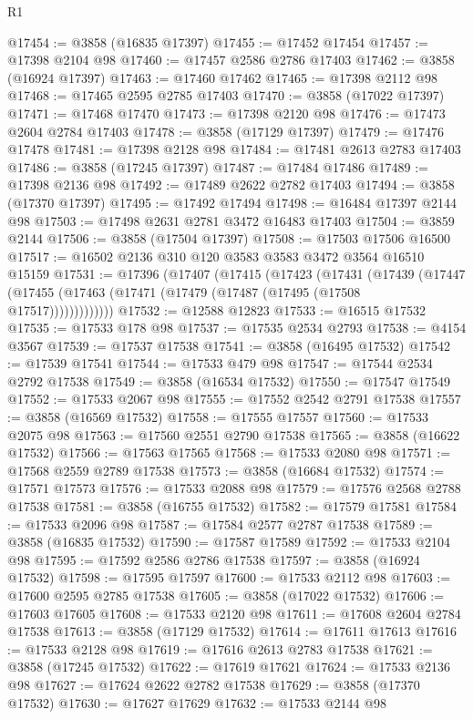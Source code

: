 \begin{lexlean}{R1}
\begin{coremodule}
@17454 := @3858 (@16835 @17397)
@17455 := @17452 @17454
@17457 := @17398 @2104 @98
@17460 := @17457 @2586 @2786 @17403
@17462 := @3858 (@16924 @17397)
@17463 := @17460 @17462
@17465 := @17398 @2112 @98
@17468 := @17465 @2595 @2785 @17403
@17470 := @3858 (@17022 @17397)
@17471 := @17468 @17470
@17473 := @17398 @2120 @98
@17476 := @17473 @2604 @2784 @17403
@17478 := @3858 (@17129 @17397)
@17479 := @17476 @17478
@17481 := @17398 @2128 @98
@17484 := @17481 @2613 @2783 @17403
@17486 := @3858 (@17245 @17397)
@17487 := @17484 @17486
@17489 := @17398 @2136 @98
@17492 := @17489 @2622 @2782 @17403
@17494 := @3858 (@17370 @17397)
@17495 := @17492 @17494
@17498 := @16484 @17397 @2144 @98
@17503 := @17498 @2631 @2781 @3472 @16483 @17403
@17504 := @3859 @2144
@17506 := @3858 (@17504 @17397)
@17508 := @17503 @17506 @16500
@17517 := @16502 @2136 @310 @120 @3583 @3583 @3472 @3564 @16510 @15159
@17531 := @17396
    (@17407
      (@17415
        (@17423
          (@17431
            (@17439
              (@17447 (@17455 (@17463 (@17471 (@17479 (@17487 (@17495 (@17508 @17517)))))))))))))
@17532 := @12588 @12823
@17533 := @16515 @17532
@17535 := @17533 @178 @98
@17537 := @17535 @2534 @2793
@17538 := @4154 @3567
@17539 := @17537 @17538
@17541 := @3858 (@16495 @17532)
@17542 := @17539 @17541
@17544 := @17533 @479 @98
@17547 := @17544 @2534 @2792 @17538
@17549 := @3858 (@16534 @17532)
@17550 := @17547 @17549
@17552 := @17533 @2067 @98
@17555 := @17552 @2542 @2791 @17538
@17557 := @3858 (@16569 @17532)
@17558 := @17555 @17557
@17560 := @17533 @2075 @98
@17563 := @17560 @2551 @2790 @17538
@17565 := @3858 (@16622 @17532)
@17566 := @17563 @17565
@17568 := @17533 @2080 @98
@17571 := @17568 @2559 @2789 @17538
@17573 := @3858 (@16684 @17532)
@17574 := @17571 @17573
@17576 := @17533 @2088 @98
@17579 := @17576 @2568 @2788 @17538
@17581 := @3858 (@16755 @17532)
@17582 := @17579 @17581
@17584 := @17533 @2096 @98
@17587 := @17584 @2577 @2787 @17538
@17589 := @3858 (@16835 @17532)
@17590 := @17587 @17589
@17592 := @17533 @2104 @98
@17595 := @17592 @2586 @2786 @17538
@17597 := @3858 (@16924 @17532)
@17598 := @17595 @17597
@17600 := @17533 @2112 @98
@17603 := @17600 @2595 @2785 @17538
@17605 := @3858 (@17022 @17532)
@17606 := @17603 @17605
@17608 := @17533 @2120 @98
@17611 := @17608 @2604 @2784 @17538
@17613 := @3858 (@17129 @17532)
@17614 := @17611 @17613
@17616 := @17533 @2128 @98
@17619 := @17616 @2613 @2783 @17538
@17621 := @3858 (@17245 @17532)
@17622 := @17619 @17621
@17624 := @17533 @2136 @98
@17627 := @17624 @2622 @2782 @17538
@17629 := @3858 (@17370 @17532)
@17630 := @17627 @17629
@17632 := @17533 @2144 @98

\end{coremodule}
\end{lexlean}
